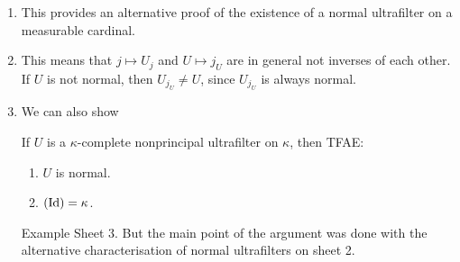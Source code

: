 \documentclass{article}
\begin{document}
\begin{remark*}\hspace{0.1cm}
    \begin{enumerate}
        \item This provides an alternative proof of the existence of a normal ultrafilter on a measurable cardinal.
        \item This means that $j \mapsto U_{j}$ and $U \mapsto j_{U}$ are in general not inverses of each other. If $U$ is not normal, then $U_{j_{U}} \neq U$, since $U_{j_{U}}$ is always normal.
        \item We can also show 
        \begin{fancyprop}{}
            If $U$ is a $\kappa$-complete nonprincipal ultrafilter on $\kappa$, then TFAE: \begin{enumerate}
                \item[(i)] $U$ is normal.
                \item[(ii)] $(\operatorname{Id})=\kappa$.
            \end{enumerate}
        \end{fancyprop}
        \proof Example Sheet 3. But the main point of the argument was done with the alternative characterisation of normal ultrafilters on sheet 2. \endproof 
    \end{enumerate}
\end{remark*} 
\end{document}
